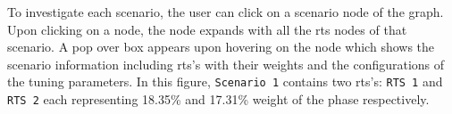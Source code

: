 To investigate each scenario, the user can click on a scenario node of the graph. Upon clicking on a node, the node expands with all the rts nodes of that scenario. A pop over box appears upon hovering on the node which shows the scenario information including rts's with their weights and the configurations of the tuning parameters. In this figure, \texttt{Scenario~1} contains two rts's: \texttt{RTS~1} and \texttt{RTS~2} each representing 18.35\% and 17.31\% weight of the phase respectively.